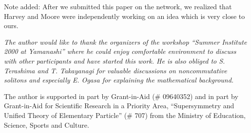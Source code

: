 \documentclass[a4paper,12pt]{article}
\begin{document}
\vskip 10mm
Note added: After we submitted this paper on the network, 
we realized that Harvey and Moore \cite{r:HM} were 
independently working on an idea which is very close to ours.

\vskip 10mm
\hskip 2mm
{\em \small The author would like to thank the organizers of the workshop
``Summer Institute 2000 at Yamanashi'' where he could
enjoy comfortable environment to discuss
with other participants and have started this work.
He is also  obliged to S. Terashima and T. Takayanagi
for valuable discussions on noncommutative solitons
and especially E. Ogasa for explaining the 
mathematical background. 

The author is supported in part by Grant-in-Aid 
(\# 09640352) and in part by Grant-in-Aid for Scientific
Research in a Priority Area, ``Supersymmetry and Unified
Theory of Elementary Particle'' (\# 707) from
the Ministry of Education, Science, Sports and Culture.}
\end{document}
